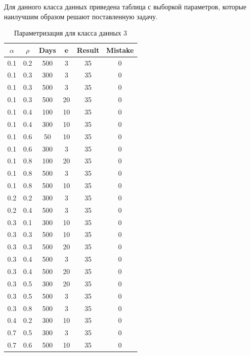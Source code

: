Для данного класса данных приведена таблица с выборкой параметров, которые наилучшим образом решают поставленную задачу.

\begin{center}
	\captionsetup{justification=raggedright,singlelinecheck=off}
	\begin{longtable}[c]{|c|c|c|c|c|c|}
		\caption{Параметризация для класса данных 3\label{tbl:table_kd3}} 
		\\ \hline
		$\alpha$ & $\rho$ & Days & e & Result & Mistake \\ \hline
		0.1 &  0.2 &  500 &    3 &    35 &     0 \\ \hline
		0.1 &  0.3 &  300 &    3 &    35 &     0 \\	\hline
		0.1 &  0.3 &  500 &    3 &    35 &     0 \\	\hline
		0.1 &  0.3 &  500 &   20 &    35 &     0 \\	\hline
		0.1 &  0.4 &  100 &   10 &    35 &     0 \\	\hline
		0.1 &  0.4 &  300 &   10 &    35 &     0 \\	\hline
		0.1 &  0.6 &   50 &   10 &    35 &     0 \\	\hline
		0.1 &  0.6 &  300 &    3 &    35 &     0 \\	\hline
		0.1 &  0.8 &  100 &   20 &    35 &     0 \\	\hline
		0.1 &  0.8 &  500 &    3 &    35 &     0 \\	\hline
		0.1 &  0.8 &  500 &   10 &    35 &     0 \\	\hline
		0.2 &  0.2 &  300 &    3 &    35 &     0 \\	\hline
		0.2 &  0.4 &  500 &    3 &    35 &     0 \\	\hline
		0.3 &  0.1 &  300 &   10 &    35 &     0 \\	\hline
		0.3 &  0.3 &  500 &   10 &    35 &     0 \\	\hline
		0.3 &  0.3 &  500 &   20 &    35 &     0 \\	\hline
		0.3 &  0.4 &  500 &    3 &    35 &     0 \\	\hline
		0.3 &  0.4 &  500 &   20 &    35 &     0 \\	\hline
		0.3 &  0.5 &  300 &   20 &    35 &     0 \\	\hline
		0.3 &  0.5 &  500 &    3 &    35 &     0 \\	\hline
		0.3 &  0.8 &  500 &    3 &    35 &     0 \\	\hline
		0.4 &  0.2 &  300 &   10 &    35 &     0 \\	\hline
		0.7 &  0.5 &  300 &    3 &    35 &     0 \\	\hline
		0.7 &  0.6 &  500 &   10 &    35 &     0 \\	\hline
	\end{longtable}
\end{center}

